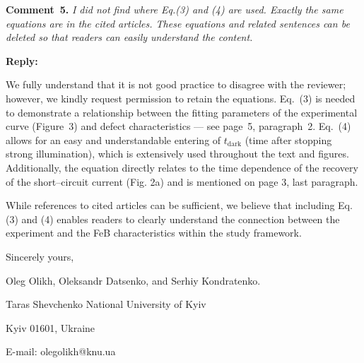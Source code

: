 \documentclass{WileyMSP-template}
\begin{document}




\vspace{1cm}
\noindent
\textcolor[rgb]{0.00,0.50,1.00}{\textbf{Comment~5.}}
\emph{ I did not find where Eq.(3) and (4) are used.
Exactly the same equations are in the cited articles.
These equations and related sentences can be deleted so that readers can easily understand the content.}

\noindent
\textcolor[rgb]{0.51,0.00,0.00}{\textbf{Reply:}}

We fully understand that it is not good practice to disagree with the reviewer;
however, we kindly request permission to retain the equations.
Eq.~(3) is needed to demonstrate a relationship between the fitting parameters of the experimental curve
(Figure~3) and defect characteristics --- see page~5, paragraph~2.
Eq.~(4) allows for an easy and understandable entering of $t_\mathrm{dark}$
(time after stopping strong illumination),
which is extensively used throughout the text and figures.
Additionally, the equation directly relates to the time dependence of the recovery of the short--circuit current (Fig. 2a)
and is mentioned on page 3, last paragraph.

While references to cited articles can be sufficient,
we believe that including Eq.(3) and (4) enables readers to clearly understand
the connection between the experiment and the FeB characteristics within the study framework.





\vspace{3cm}

Sincerely yours,

Oleg Olikh, Oleksandr Datsenko, and Serhiy Kondratenko.


Taras Shevchenko National University of Kyiv


Kyiv 01601, Ukraine

E-mail: olegolikh@knu.ua



\end{document}
